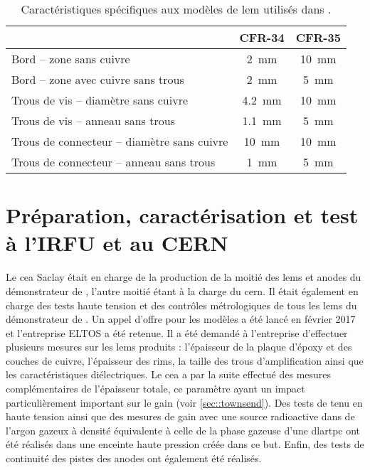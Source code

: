       \begin{table}
        \centering
        \begin{tabular}{|l|c|c|}
          \hline
           & CFR-34 & CFR-35\\
          \hline
          Bord -- zone sans cuivre & \SI{2}{\milli\meter} & \SI{10}{\milli\meter}\\
          Bord -- zone avec cuivre sans trous & \SI{2}{\milli\meter} & \SI{5}{\milli\meter}\\
          Trous de vis -- diamètre sans cuivre & \SI{4.2}{\milli\meter} & \SI{10}{\milli\meter} \\
          Trous de vis -- anneau sans trous &  \SI{1.1}{\milli\meter} & \SI{5}{\milli\meter} \\
          Trous de connecteur -- diamètre sans cuivre & \SI{10}{\milli\meter} & \SI{10}{\milli\meter} \\
          Trous de connecteur -- anneau sans trous & \SI{1}{\milli\meter} & \SI{5}{\milli\meter} \\
          \hline
        \end{tabular}
        \caption{\label{tab::lem_diff}Caractéristiques spécifiques aux modèles de \gls{lem} utilisés dans \protodp{}.}
      \end{table}

  \section{Préparation, caractérisation et test à l'IRFU et au CERN}
    
    Le \gls{cea} Saclay était en charge de la production de la moitié des \glspl{lem} et anodes du démonstrateur de \SSS{}, l'autre moitié étant à la charge du \gls{cern}. Il était également en charge des tests haute tension et des contrôles métrologiques de tous les \glspl{lem} du démonstrateur de \SSS{}. Un appel d'offre pour les modèles a été lancé en février 2017 et l'entreprise ELTOS a été retenue. Il a été demandé à l'entreprise d'effectuer plusieurs mesures sur les \glspl{lem} produits : l'épaisseur de la plaque d'époxy et des couches de cuivre, l'épaisseur des rims, la taille des trous d'amplification ainsi que les caractéristiques diélectriques. Le \gls{cea} a par la suite effectué des mesures complémentaires de l'épaisseur totale, ce paramètre ayant un impact particulièrement important sur le gain (voir \autoref{sec::townsend}). Des tests de tenu en haute tension ainsi que des mesures de gain avec une source radioactive dans de l'argon gazeux à densité équivalente à celle de la phase gazeuse d'une \gls{dlartpc} ont été réalisés dans une enceinte haute pression créée dans ce but. Enfin, des tests de continuité des pistes des anodes ont également été réalisés.
        
